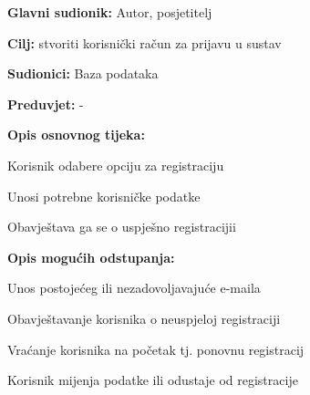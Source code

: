 					\noindent {}
					\begin{packed_item}
	
						\item \textbf{Glavni sudionik: }Autor, posjetitelj
						\item  \textbf{Cilj:} stvoriti korisnički račun za prijavu u sustav
						\item  \textbf{Sudionici:} Baza podataka
						\item  \textbf{Preduvjet:} -
						\item  \textbf{Opis osnovnog tijeka:}
						
						\item[] \begin{packed_enum}
	
							\item Korisnik odabere opciju za registraciju
							\item Unosi potrebne korisničke podatke
							\item Obavještava ga se o uspješno registracijii
						\end{packed_enum}
						
						\item  \textbf{Opis mogućih odstupanja:}
						
						\item[] \begin{packed_enum}
	
							\item Unos postojećeg ili nezadovoljavajuće e-maila

							\item[] \begin{packed_enum}
								
								\item Obavještavanje korisnika o neuspjeloj registraciji
								\item Vraćanje korisnika na početak tj. ponovnu registracij
								\item Korisnik mijenja podatke ili odustaje od registracije
								
							\end{packed_enum}
							
						\end{packed_enum}
					\end{packed_item}

